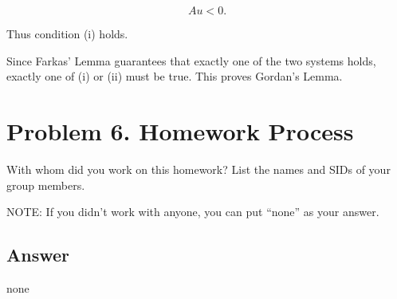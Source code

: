 \documentclass[
	12pt,
]{fphw}
\begin{document}
\[
Au < 0.
\]

Thus condition (i) holds.

\bigskip

Since Farkas' Lemma guarantees that exactly one of the two systems holds, exactly one of (i) or (ii) must be true. This proves Gordan’s Lemma.






\newpage
\section*{Problem 6. Homework Process}

With whom did you work on this homework? List the names and SIDs of your group members.

NOTE: If you didn’t work with anyone, you can put “none” as your answer.

\subsection*{Answer}
none






\end{document}

